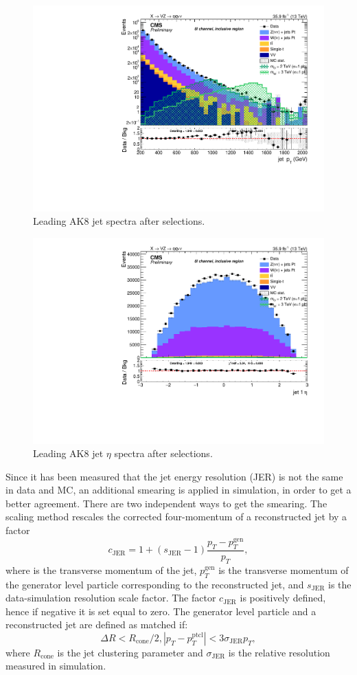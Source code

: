 \begin{figure}[!htb]
  \begin{center}
    \includegraphics[width=.495\textwidth]{plots/v9_U/XVZnnInc/FatJet1_pt.pdf}
  \end{center}
  \caption{Leading AK8 jet \pt spectra after selections.}
  \label{fig:AK8jet_pt}
\end{figure}

\begin{figure}[!htb]
  \begin{center}
    \includegraphics[width=.495\textwidth]{plots/v9_U/XVZnnInc/FatJet1_eta.pdf}
  \end{center}
  \caption{Leading AK8 jet $\eta$ spectra after selections.}
  \label{fig:AK8jet_eta}
\end{figure}

\noindent Since it has been measured that the jet energy resolution (JER) is not the same in data and MC, an additional smearing is applied in simulation, in order to get a better agreement. There are two independent ways to get the smearing. The scaling method rescales the corrected four-momentum of a reconstructed jet by a factor
\begin{equation}
c_{\text{JER}} = 1 + (s_{\text{JER}} - 1) \frac{p_T - p_T^{\text{gen}}}{p_T},
\end{equation}
where \pt is the transverse momentum of the jet, $p_T^{\text{gen}}$ is the transverse momentum of the generator level particle corresponding to the reconstructed jet, and $s_{\text{JER}}$ is the data-simulation resolution scale factor. The factor $c_{\text{JER}}$ is positively defined, hence if negative it is set equal to zero. %
The generator level particle and a reconstructed jet are defined as matched if:
\begin{equation}
\Delta R < R_{\text{cone}} / 2, |p_T - p_T^{\text{ptcl}}| < 3 \sigma_{\text{JER}} p_{T},
\end{equation}
where $R_{\text{cone}}$ is the jet clustering parameter and $\sigma_{\text{JER}}$ is the relative \pt resolution measured in simulation.

